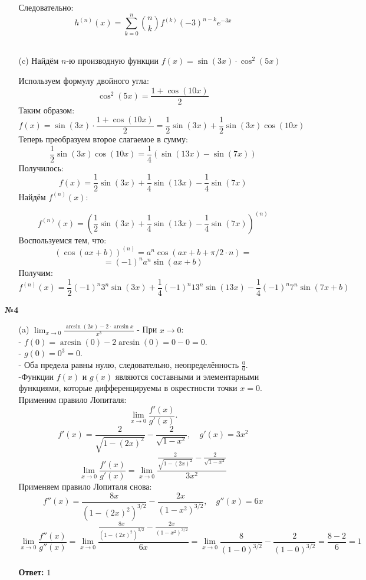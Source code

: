 \documentclass[a4paper]{article}
\begin{document}
\begin{enumerate}
\begin{enumerate}
        Следовательно:
        $$
        h^{(n)}(x) = \sum_{k=0}^{n} \binom{n}{k} f^{(k)}(-3)^{n-k} e^{-3x}
        $$\\

        \item[(c)] Найдём $ n $-ю производную функции $ f(x) = \sin(3x) \cdot \cos^2(5x) $
        
        Используем формулу двойного угла:
        $$
        \cos^2(5x) = \frac{1 + \cos(10x)}{2}
        $$
        Таким образом:
        $$
        f(x) = \sin(3x) \cdot \frac{1 + \cos(10x)}{2} = \frac{1}{2} \sin(3x) + \frac{1}{2} \sin(3x) \cos(10x)
        $$
        Теперь преобразуем второе слагаемое в сумму:
        $$
        \frac{1}{2} \sin(3x) \cos(10x) = \frac{1}{4} \left( \sin(13x) - \sin(7x) \right)
        $$
        Получилось:
        $$
        f(x) = \frac{1}{2} \sin(3x) + \frac{1}{4} \sin(13x) - \frac{1}{4} \sin(7x)
        $$
        Найдём $f^{(n)}(x)$:
        
        $$f^{(n)}(x) = \left(\frac{1}{2} \sin(3x) + \frac{1}{4} \sin(13x) - \frac{1}{4} \sin(7x)\right)^{(n)} $$
        Воспользуемся тем, что:
        $$(\cos (a x+b))^{(n)}=a^{n} \cos (a x+b+\pi / 2 \cdot n) = $$
        $$=(-1)^na^n\sin{(ax+b)}$$
        Получим:
        $$f^{(n)}(x) = \frac{1}{2} (-1)^n3^n\sin{(3x)}+ \frac{1}{4} (-1)^n13^n\sin{(13x)} - \frac{1}{4} (-1)^n7^n\sin{(7x+b)}$$

    \end{enumerate}

    \item[\textbf{№4}]
    \begin{enumerate}
        \item[(a)]$\lim _{x \rightarrow 0} \frac{\arcsin (2 x)-2 \cdot \arcsin x}{x^{3}}$
        - При $x \to 0$:\\
        - $f(0) = \arcsin(0) - 2\arcsin(0) = 0 - 0 = 0$.\\
        - $g(0) = 0^3 = 0$.\\
        - Оба предела равны нулю, следовательно, неопределённость $\frac{0}{0}$.\\
        -Функции $f(x)$ и $g(x)$ являются составными и элементарными функциями, которые дифференцируемы в окрестности точки $x = 0$.\\
        Применим правило Лопиталя:
        $$
        \lim_{x \to 0} \frac{f'(x)}{g'(x)}.
        $$
        $$
        f'(x) = \frac{2}{\sqrt{1-(2x)^2}} - \frac{2}{\sqrt{1-x^2}}, \quad g'(x) = 3x^2
        $$
        $$
        \lim_{x \to 0} \frac{f'(x)}{g'(x)} = \lim_{x \to 0} \frac{\frac{2}{\sqrt{1-(2x)^2}} - \frac{2}{\sqrt{1-x^2}}}{3x^2}
        $$
        Применяем правило Лопиталя снова:
        $$
        f''(x) = \frac{8x}{(1-(2x)^2)^{3/2}} - \frac{2x}{(1-x^2)^{3/2}}, \quad g''(x) = 6x
        $$
        $$\lim_{x \to 0} \frac{f''(x)}{g''(x)} = \lim_{x \to 0} \frac{\frac{8x}{(1-(2x)^2)^{3/2}} - \frac{2x}{(1-x^2)^{3/2}}}{6x} = \lim_{x \to 0} \frac{8}{(1-0)^{3/2}} - \frac{2}{(1-0)^{3/2}} = \frac{8 - 2}{6} = 1$$
        \\\textbf{Ответ: }$1$\\


\end{enumerate}
\end{enumerate}
\end{document}
